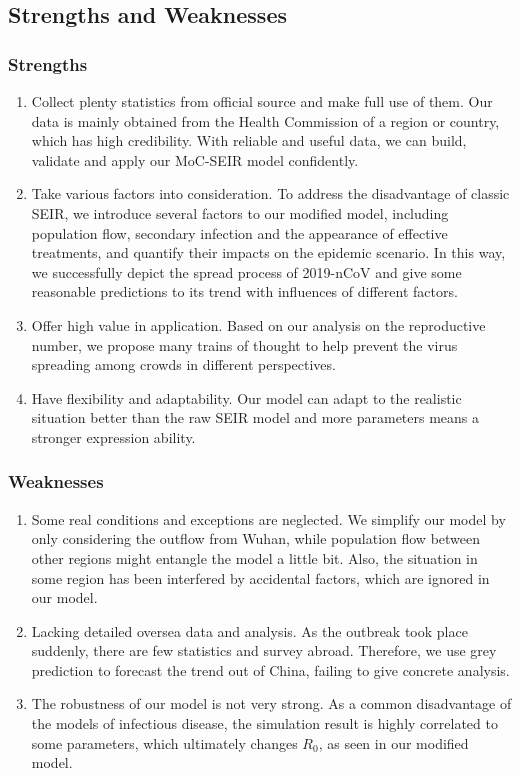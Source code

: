 \documentclass[12pt]{mcmthesis}
\begin{document}
\subsection{Strengths and Weaknesses}
\subsubsection{Strengths}
\begin{enumerate}
    \item Collect plenty statistics from official source and make full use of them. Our data is mainly obtained from the Health Commission of a region or country, which has high credibility. With reliable and useful data, we can build, validate and apply our MoC-SEIR model confidently.
    \item Take various factors into consideration. To address the disadvantage of classic SEIR, we introduce several factors to our modified model, including population flow, secondary infection and the appearance of effective treatments, and quantify their impacts on the epidemic scenario. In this way, we successfully depict the spread process of 2019-nCoV and give some reasonable predictions to its trend with influences of different factors.
    \item Offer high value in application. Based on our analysis on the reproductive number, we propose many trains of thought to help prevent the virus spreading among crowds in different perspectives.
    \item Have flexibility and adaptability. Our model can adapt to the realistic situation better than the raw SEIR model and more parameters means a stronger expression ability.
\end{enumerate}

\subsubsection{Weaknesses}
\begin{enumerate}
    \item Some real conditions and exceptions are neglected. We simplify our model by only considering the outflow from Wuhan, while population flow between other regions might entangle the model a little bit. Also, the situation in some region has been interfered by accidental factors, which are ignored in our model.
    \item Lacking detailed oversea data and analysis. As the outbreak took place suddenly, there are few statistics and survey abroad. Therefore, we use grey prediction to forecast the trend out of China, failing to give concrete analysis.
    \item The robustness of our model is not very strong. As a common disadvantage of the models of infectious disease, the simulation result is highly correlated to some parameters, which ultimately changes $R_0$, as seen in our modified model.
    
\end{enumerate}
\end{document}
